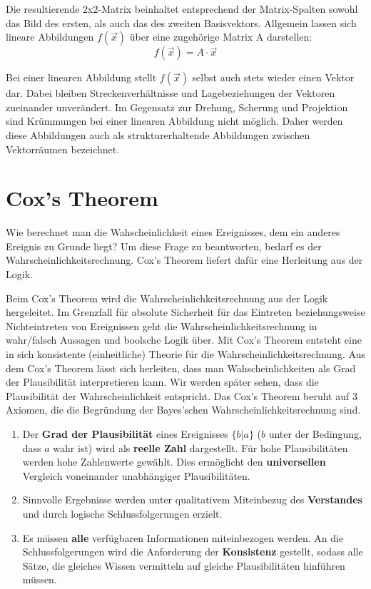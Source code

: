\documentclass[]{dsadokumentation}
\begin{document}
Die resultierende $2$x$2$-Matrix beinhaltet entsprechend der Matrix-Spalten sowohl das Bild des ersten, als auch das des zweiten Basisvektors. Allgemein lassen sich lineare Abbildungen $f(\vec{x})$ über eine zugehörige Matrix A darstellen:
\[ f(\vec{x}) = A \cdot \vec{x} \]

Bei einer linearen Abbildung stellt $f(\vec{x})$ selbst auch stets wieder einen Vektor dar. Dabei bleiben Streckenverhältnisse und Lagebeziehungen der Vektoren zueinander unverändert. Im Gegensatz zur Drehung, Scherung und Projektion sind Krümmungen bei einer linearen Abbildung nicht möglich. Daher werden diese Abbildungen auch als strukturerhaltende Abbildungen zwischen Vektorräumen bezeichnet.

\section{Cox's Theorem}
Wie berechnet man die Wahscheinlichkeit eines Ereignisses, dem ein anderes Ereignis zu Grunde liegt? Um diese Frage zu beantworten, bedarf es der Wahrscheinlichkeitsrechnung. Cox's Theorem liefert dafür eine Herleitung aus der Logik.


Beim Cox's Theorem wird die Wahrscheinlichkeitsrechnung aus  der Logik hergeleitet. Im Grenzfall für absolute Sicherheit für das Eintreten beziehungsweise Nichteintreten von Ereignissen geht die Wahrscheinlichkeitsrechnung in wahr/falsch Aussagen und boolsche Logik über. Mit Cox's Theorem entsteht eine in sich konsistente (einheitliche) Theorie für die Wahrscheinlichkeitsrechnung.
Aus dem Cox's Theorem lässt sich herleiten, dass man Wahscheinlichkeiten als Grad der Plausibilität interpretieren kann. Wir werden später sehen, dass die Plausibilität der Wahrscheinlichkeit entspricht.
Das Cox's Theorem beruht auf 3 Axiomen, die die Begründung der Bayes'schen Wahrscheinlichkeitsrechnung sind.


\begin{enumerate}
 \item Der \textbf{Grad der Plausibilität} eines Ereignisses $\{b|a\}$ ($b$ unter der Bedingung, dass $a$ wahr ist) wird als \textbf{reelle Zahl} dargestellt. Für hohe Plausibilitäten werden hohe Zahlenwerte gewählt. Dies ermöglicht den \textbf {universellen} Vergleich voneinander unabhängiger Plausibilitäten.

 \item Sinnvolle Ergebnisse werden unter qualitativem Miteinbezug des \textbf{Verstandes} und durch logische Schlussfolgerungen erzielt.
 \item Es müssen \textbf{alle} verfügbaren Informationen miteinbezogen werden. An die Schlussfolgerungen wird die Anforderung der \textbf{Konsistenz} gestellt, sodass alle Sätze, die gleiches Wissen vermitteln auf gleiche Plausibilitäten hinführen müssen.
\end{enumerate}
\end{document}

